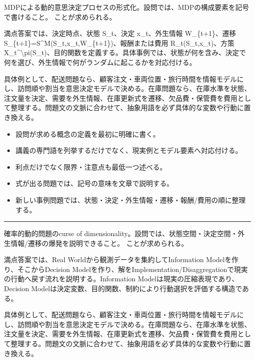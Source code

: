 \clearpage{}
MDPによる動的意思決定プロセスの形式化。設問では、MDPの構成要素を記号で書けること。 ことが求められる。\par
{}
満点答案では、決定時点、状態 S\_t、決定 x\_t、外生情報 W\_\{t+1\}、遷移 S\_\{t+1\}=S\textasciicircum{}M(S\_t,x\_t,W\_\{t+1\})、報酬または費用 R\_t(S\_t,x\_t)、方策 X\_t\textasciicircum{}\textbackslash{}pi(S\_t)、目的関数を定義する。具体事例では、状態が何を含み、決定で何を選び、外生情報で何がランダムに起こるかを対応付ける。\par
{}
具体例として、配送問題なら、顧客注文・車両位置・旅行時間を情報モデルにし、訪問順や割当を意思決定モデルで決める。在庫問題なら、在庫水準を状態、注文量を決定、需要を外生情報、在庫更新式を遷移、欠品費・保管費を費用として整理する。問題文の文脈に合わせて、抽象用語を必ず具体的な変数や行動に置き換える。\par
{}
\begin{itemize}
\item 設問が求める概念の定義を最初に明確に書く。
\item 講義の専門語を列挙するだけでなく、現実例とモデル要素へ対応付ける。
\item 利点だけでなく限界・注意点も最低一つ述べる。
\item 式が出る問題では、記号の意味を文章で説明する。
\item 新しい事例問題では、状態・決定・外生情報・遷移・報酬/費用の順に整理する。
\end{itemize}
\vspace{2mm}\hrule\vspace{2mm}
確率的動的問題のcurse of dimensionality。設問では、状態空間・決定空間・外生情報/遷移の爆発を説明できること。 ことが求められる。\par
{}
満点答案では、Real Worldから観測データを集約してInformation Modelを作り、そこからDecision Modelを作り、解をImplementation/Disaggregationで現実の行動へ戻す流れを説明する。Information Modelは現実の圧縮表現であり、Decision Modelは決定変数、目的関数、制約により行動選択を評価する構造である。\par
{}
具体例として、配送問題なら、顧客注文・車両位置・旅行時間を情報モデルにし、訪問順や割当を意思決定モデルで決める。在庫問題なら、在庫水準を状態、注文量を決定、需要を外生情報、在庫更新式を遷移、欠品費・保管費を費用として整理する。問題文の文脈に合わせて、抽象用語を必ず具体的な変数や行動に置き換える。\par
